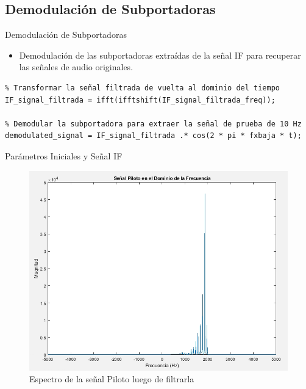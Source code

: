 \documentclass[mathserif,spanish]{beamer}
\begin{document}
\subsection{Demodulación de Subportadoras}
\begin{frame}{Demodulación de Subportadoras}
    \begin{itemize}
        \item Demodulación de las subportadoras extraídas de la señal IF para recuperar las señales de audio originales.
    \end{itemize}
    \begin{tcolorbox}[colback=yellow!5!white, colframe=yellow!75!black, title=Demodulación de Subportadoras, fonttitle=\normalsize, fontupper=\normalsize]
\begin{lstlisting}
% Transformar la señal filtrada de vuelta al dominio del tiempo
IF_signal_filtrada = ifft(ifftshift(IF_signal_filtrada_freq));

% Demodular la subportadora para extraer la señal de prueba de 10 Hz
demodulated_signal = IF_signal_filtrada .* cos(2 * pi * fxbaja * t);
\end{lstlisting}
    \end{tcolorbox}
\end{frame}





\begin{frame}{Parámetros Iniciales y Señal IF}
 
    \begin{figure}[h]
        \centering
        \includegraphics[scale=0.25]{signal_piloto.png}
        \caption{Espectro de la señal Piloto luego de filtrarla}
    \end{figure}
    
\end{frame}
\end{document}
